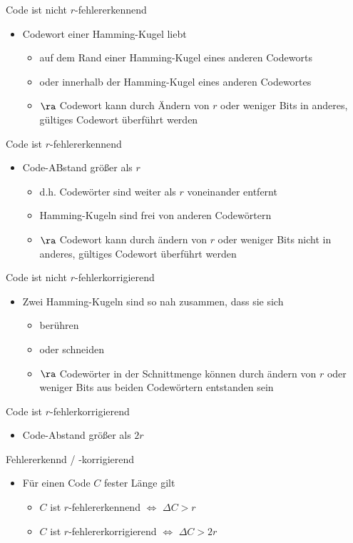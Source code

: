       Code ist nicht $r$-fehlererkennend
      \begin{itemize}
        \item Codewort einer Hamming-Kugel liebt
          \begin{itemize}
            \item auf dem Rand einer Hamming-Kugel eines anderen Codeworts
            \item oder innerhalb der Hamming-Kugel eines anderen Codewortes
            \item $\ra$ Codewort kann durch Ändern von $r$ oder weniger Bits in anderes, gültiges
              Codewort überführt werden
          \end{itemize}
      \end{itemize}
      Code ist $r$-fehlererkennend
      \begin{itemize}
        \item Code-ABstand größer als $r$
          \begin{itemize}
            \item d.h. Codewörter sind weiter als $r$ voneinander entfernt
            \item Hamming-Kugeln sind frei von anderen Codewörtern
            \item $\ra$ Codewort kann durch ändern von $r$ oder weniger Bits nicht in anderes,
              gültiges Codewort überführt werden
          \end{itemize}
      \end{itemize}
      Code ist nicht $r$-fehlerkorrigierend
      \begin{itemize}
        \item Zwei Hamming-Kugeln sind so nah zusammen, dass sie sich
          \begin{itemize}
            \item berühren
            \item oder schneiden
            \item $\ra$ Codewörter in der Schnittmenge können durch ändern von $r$ oder
              weniger Bits aus beiden Codewörtern entstanden sein
          \end{itemize}
      \end{itemize}
      Code ist $r$-fehlerkorrigierend
      \begin{itemize}
        \item Code-Abstand größer als $2r$
      \end{itemize}
      Fehlererkennd / -korrigierend
      \begin{itemize}
        \item Für einen Code $C$ fester Länge gilt
          \begin{itemize}
            \item $C$ ist $r$-fehlererkennend $\Leftrightarrow$ $\Delta C >r$
            \item $C$ ist $r$-fehlererkorrigierend $\Leftrightarrow$ $\Delta C >2r$
          \end{itemize}
      \end{itemize}
